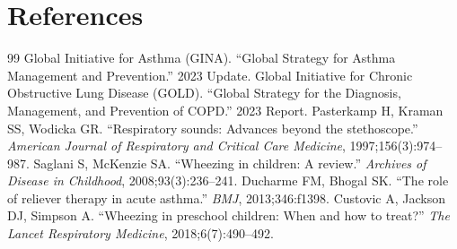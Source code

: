 \section*{References}
\begin{thebibliography}{99}
 Global Initiative for Asthma (GINA). ``Global Strategy for Asthma Management and Prevention.'' 2023 Update.
 Global Initiative for Chronic Obstructive Lung Disease (GOLD). ``Global Strategy for the Diagnosis, Management, and Prevention of COPD.'' 2023 Report.
 Pasterkamp H, Kraman SS, Wodicka GR. ``Respiratory sounds: Advances beyond the stethoscope.'' \textit{American Journal of Respiratory and Critical Care Medicine}, 1997;156(3):974--987.
 Saglani S, McKenzie SA. ``Wheezing in children: A review.'' \textit{Archives of Disease in Childhood}, 2008;93(3):236--241.
 Ducharme FM, Bhogal SK. ``The role of reliever therapy in acute asthma.'' \textit{BMJ}, 2013;346:f1398.
 Custovic A, Jackson DJ, Simpson A. ``Wheezing in preschool children: When and how to treat?'' \textit{The Lancet Respiratory Medicine}, 2018;6(7):490--492.
\end{thebibliography}

